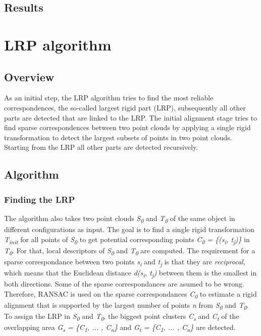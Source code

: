 \subsection{Results}

\section{LRP algorithm}

\subsection{Overview}
As an initial step, the LRP algorithm tries to find the most reliable correspondences, the so-called largest rigid part (LRP), subsequently all other parts are detected that are linked to the LRP. The initial alignment stage tries to find sparse correspondences between two point clouds by applying a single rigid transformation to detect the largest subsets of points in two point clouds. Starting from the LRP all other parts are detected recursively.


\subsection{Algorithm} 

\subsubsection{Finding the LRP}

The algorithm also takes two point clouds \textit{S\textsubscript{0}} and \textit{T\textsubscript{0}} of the same object in different configurations as input.
The goal is to find a single rigid transformation \textit{T\textsubscript{init}} for all points of \textit{S\textsubscript{0}} to get potential corresponding points \textit{C\textsubscript{0} = \{(s\textsubscript{i}, t\textsubscript{j})\}} in \textit{T\textsubscript{0}}. For that, local descriptors of \textit{S\textsubscript{0}} and \textit{T\textsubscript{0}} are computed. The requirement for a sparse correspondance between two points \textit{s\textsubscript{i}} and \textit{t\textsubscript{j}}  is that they are \textit{reciprocal}, which means that the Euclidean distance \textit{d(s\textsubscript{i}, t\textsubscript{j})} between them is the smallest in both directions. Some of the sparse correspondances are asumed to be wrong. Therefore, RANSAC is used on the sparse correspondances \textit{C\textsubscript{0}} to estimate a rigid alignment that is supported by the largest number of points \textit{n} from \textit{S\textsubscript{0}} and \textit{T\textsubscript{0}}. To assign the LRP in \textit{S\textsubscript{0}} and \textit{T\textsubscript{0}}, the biggest point clusters \textit{C\textsubscript{s}} and \textit{C\textsubscript{t}} of the overlapping area \textit{G\textsubscript{s} = \{C\textsubscript{1}, ... , C\textsubscript{n}\} } and \textit{G\textsubscript{t} = \{C\textsubscript{1}, ... , C\textsubscript{n}\} } are detected. 


